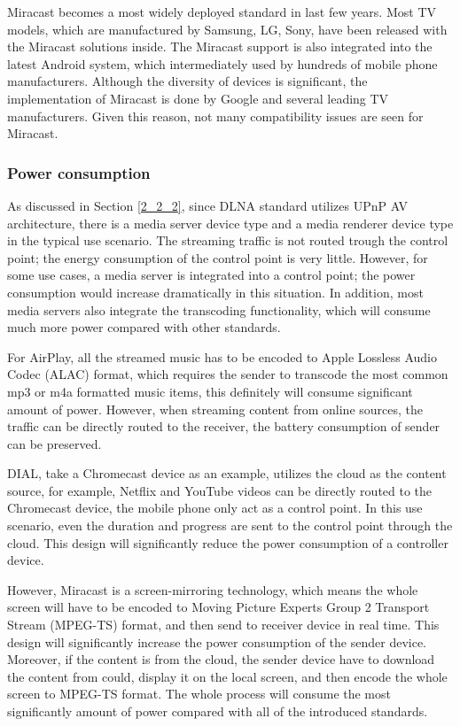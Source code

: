 Miracast becomes a most widely deployed standard in last few years. Most TV
models, which are manufactured by Samsung, LG, Sony, have been released with
the Miracast solutions inside. The Miracast support is also integrated into the
latest Android system, which intermediately used by hundreds of mobile phone
manufacturers. Although the diversity of devices is significant, the
implementation of Miracast is done by Google and several leading TV
manufacturers. Given this reason, not many compatibility issues are seen for
Miracast.

\subsubsection{Power consumption\label{2_3_3_4}}
As discussed in Section \ref{2_2_2}, since DLNA standard utilizes UPnP AV
architecture, there is a media server device type and a media renderer device
type in the typical use scenario. The streaming traffic is not routed trough
the control point; the energy consumption of the control point is very little.
However, for some use cases, a media server is integrated into a control point;
the power consumption would increase dramatically in this situation. In
addition, most media servers also integrate the transcoding functionality,
which will consume much more power compared with other standards.

For AirPlay, all the streamed music has to be encoded to Apple
Lossless Audio Codec (ALAC) format, which requires the sender to transcode the
most common mp3 or m4a formatted music items, this definitely will consume
significant amount of power. However, when streaming content from online
sources, the traffic can be directly routed to the receiver, the battery
consumption of sender can be preserved.

DIAL, take a Chromecast device as an example, utilizes the cloud as the content
source, for example, Netflix and YouTube videos can be directly routed to the
Chromecast device, the mobile phone only act as a control point.
In this use scenario, even the duration and progress are sent to the control
point through the cloud. This design will significantly reduce the power
consumption of a controller device.

However, Miracast is a screen-mirroring technology, which means the whole
screen will have to be encoded to Moving Picture Experts Group 2 Transport
Stream (MPEG-TS) format, and then send to receiver device in real time. This
design will significantly increase the power consumption of the sender device.
Moreover, if the content is from the cloud, the sender device have to download
the content from could, display it on the local screen, and then encode the
whole screen to MPEG-TS format. The whole process will consume the most
significantly amount of power compared with all of the introduced standards.
